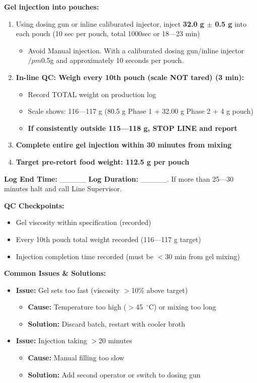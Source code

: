 {\textbf{Gel injection into pouches:}
\begin{enumerate}[resume,leftmargin=1.5em]
\item Using dosing gun or inline caliburated injector, inject \textbf{32.0 g $\pm$ 0.5 g} into each pouch (10 sec per pouch, total  1000sec  or 18---23 min)
  \begin{itemize}
  \item Avoid Manual injection.
With a caliburated dosing gun/inline injector $/pm$0.5g and approximately 10 seconds per pouch.
\end{itemize}
\item \textbf{In-line QC: Weigh every 10th pouch (scale NOT tared) (3 min):}
  \begin{itemize}
  \item Record TOTAL weight on production log
  \item Scale shows: 116---117 g (80.5 g Phase 1 + 32.00 g Phase 2 + 4 g pouch)
  \item \textbf{If consistently outside 115---118 g, STOP LINE and report}
  \end{itemize}
\item \textbf{Complete entire gel injection within 30 minutes from mixing}
\item \textbf{Target pre-retort food weight: 112.5 g per pouch}
\end{enumerate}
\textbf{Log End Time:} \_\_\_\_\_
\textbf{Log Duration:} \_\_\_\_\_.
If more than 25---30 minutes halt and call Line Supervisor.

\textbf{QC Checkpoints:}
\begin{itemize}
\item Gel viscosity within specification (recorded)
\item Every 10th pouch total weight recorded (116---117 g target)
\item Injection completion time recorded (must be $<$30 min from gel mixing)
\end{itemize}

\textbf{Common Issues \& Solutions:}
\begin{itemize}
\item \textbf{Issue:} Gel sets too fast (viscosity $>$10\% above target)
  \begin{itemize}
  \item \textbf{Cause:} Temperature too high ($>$45~$^\circ$C) or mixing too long
  \item \textbf{Solution:} Discard batch, restart with cooler broth
  \end{itemize}
\item \textbf{Issue:} Injection taking $>$20 minutes
  \begin{itemize}
  \item \textbf{Cause:} Manual filling too slow
  \item \textbf{Solution:} Add second operator or switch to dosing gun
  \end{itemize}
\end{itemize}

}
